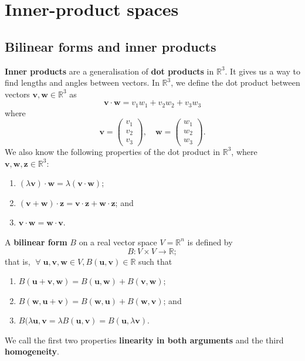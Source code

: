 \chapter{Inner-product spaces}

\section{Bilinear forms and inner products}

\textbf{Inner products} are a generalisation of \textbf{dot products} in $\mathbb{R}^3$. It gives us a way to find lengths and angles between vectors. In $\mathbb{R}^3$, we define the dot product between vectors $\bm{v}, \bm{w} \in \mathbb{R}^3$ as \[ \bm{v} \cdot \bm{w} = v_1 w_1 + v_2 w_2 + v_3 w_3 \] where 
\[
    \bm{v} =
    \begin{pmatrix}
        v_1 \\ v_2 \\ v_3
    \end{pmatrix}
    , \quad \bm{w} =
    \begin{pmatrix}
        w_1 \\ w_2 \\ w_3
    \end{pmatrix}
    .
\]
We also know the following properties of the dot product in $\mathbb{R}^3$, where $\bm{v}, \bm{w}, \bm{z} \in \mathbb{R}^3$:
\begin{enumerate}
    \item $(\lambda \bm{v}) \cdot \bm{w} = \lambda (\bm{v} \cdot \bm{w})$;
    \item $(\bm{v} + \bm{w})\cdot \bm{z} = \bm{v} \cdot \bm{z} + \bm{w} \cdot \bm{z}$; and
    \item $\bm{v} \cdot \bm{w} = \bm{w} \cdot \bm{v}$.
\end{enumerate}

\begin{definition}
    A \textbf{bilinear form} $B$ on a real vector space $V = \mathbb{R}^n$ is defined by \[ B : V \times V \to \mathbb{R}; \] that is, $\; \forall \; \bm{u}, \bm{v}, \bm{w} \in V, B(\bm{u}, \bm{v}) \in \mathbb{R}$ such that
    \begin{enumerate}
        \item $B(\bm{u} + \bm{v}, \bm{w}) = B(\bm{u}, \bm{w}) + B(\bm{v}, \bm{w})$;
        \item $B(\bm{w}, \bm{u} + \bm{v}) = B(\bm{w}, \bm{u}) + B(\bm{w}, \bm{v})$; and
        \item $B(\lambda \bm{u}, \bm{v} = \lambda B(\bm{u}, \bm{v}) = B(\bm{u}, \lambda \bm{v})$.
    \end{enumerate}
    We call the first two properties \textbf{linearity in both arguments} and the third \textbf{homogeneity}.
\end{definition}

